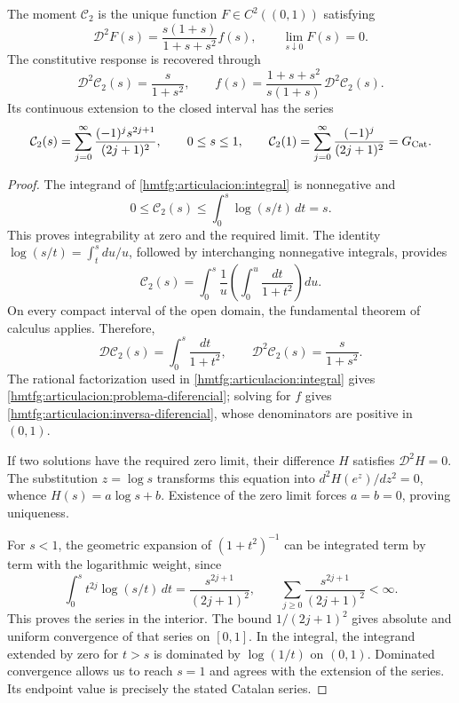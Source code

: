 \begin{proposition}
\label{hmtfg:articulacion:restitucion-catalan}
The moment \(\mathcal C_2\) is the unique function
\(F\in C^2((0,1))\) satisfying
\begin{equation}
 \mathcal D^2F(s)=\frac{s(1+s)}{1+s+s^2}f(s),\qquad
 \lim_{s\downarrow0}F(s)=0.
 \label{hmtfg:articulacion:problema-diferencial}
\end{equation}
The constitutive response is recovered through
\begin{equation}
 \mathcal D^2\mathcal C_2(s)=\frac{s}{1+s^2},\qquad
 f(s)=\frac{1+s+s^2}{s(1+s)}\,
          \mathcal D^2\mathcal C_2(s).
 \label{hmtfg:articulacion:inversa-diferencial}
\end{equation}
Its continuous extension to the closed interval has the series
\begin{equation}
 \mathcal C_2(s)=\sum_{j=0}^{\infty}
       \frac{(-1)^j s^{2j+1}}{(2j+1)^2},\qquad 0\le s\le1,
 \qquad
 \mathcal C_2(1)=\sum_{j=0}^{\infty}\frac{(-1)^j}{(2j+1)^2}
 =G_{\rm Cat}.
 \label{hmtfg:articulacion:serie-catalan}
\end{equation}
\end{proposition}
\begin{proof}
The integrand of \eqref{hmtfg:articulacion:integral} is nonnegative
and
\[
 0\le\mathcal C_2(s)\le\int_0^s\log(s/t)\,dt=s.
\]
This proves integrability at zero and the required limit.
The identity \(\log(s/t)=\int_t^s du/u\), followed by
interchanging nonnegative integrals, provides
\[
 \mathcal C_2(s)
 =\int_0^s\frac1u\left(\int_0^u\frac{dt}{1+t^2}\right)du.
\]
On every compact interval of the open domain, the
fundamental theorem of calculus applies. Therefore,
\[
 \mathcal D\mathcal C_2(s)=\int_0^s\frac{dt}{1+t^2},
 \qquad
 \mathcal D^2\mathcal C_2(s)=\frac{s}{1+s^2}.
\]
The rational factorization used in
\eqref{hmtfg:articulacion:integral} gives
\eqref{hmtfg:articulacion:problema-diferencial}; solving for \(f\)
gives \eqref{hmtfg:articulacion:inversa-diferencial}, whose
denominators are positive in \((0,1)\).

If two solutions have the required zero limit, their difference
\(H\) satisfies \(\mathcal D^2H=0\). The substitution \(z=\log s\)
transforms this equation into \(d^2H(e^z)/dz^2=0\), whence
\(H(s)=a\log s+b\). Existence of the zero limit forces
\(a=b=0\), proving uniqueness.

For \(s<1\), the geometric expansion of \((1+t^2)^{-1}\)
can be integrated term by term with the logarithmic weight, since
\[
 \int_0^s t^{2j}\log(s/t)\,dt
 =\frac{s^{2j+1}}{(2j+1)^2},\qquad
 \sum_{j\ge0}\frac{s^{2j+1}}{(2j+1)^2}<\infty.
\]
This proves the series in the interior. The bound
\(1/(2j+1)^2\) gives absolute and uniform convergence of that
series on \([0,1]\). In the integral, the integrand extended
by zero for \(t>s\) is dominated by \(\log(1/t)\)
on \((0,1)\). Dominated convergence allows us to reach
\(s=1\) and agrees with the extension of the series. Its endpoint
value is precisely the stated Catalan series.
\end{proof}

